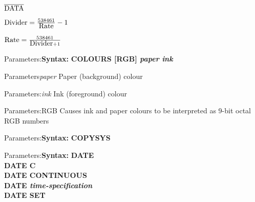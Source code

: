 \documentclass[11pt]{book}
\def\lthtmlcheckvsize{\ifdim\ht\sizebox<\vsize 
  \ifdim\wd\sizebox<\hsize\expandafter\hfill\fi \expandafter\vfill
  \else\expandafter\vss\fi}%
\begin{document}
{\newpage\clearpage
{}%
$\overline{\hbox{DATA}}$%
\lthtmlindisplaymathZ
\lthtmlcheckvsize\clearpage}

{\newpage\clearpage
{}%
$\hbox{Divider}=\frac{538461}{\hbox{Rate}}-1$%
\lthtmlindisplaymathZ
\lthtmlcheckvsize\clearpage}

{\newpage\clearpage
{}%
$\hbox{Rate}=\frac{538461}{\hbox{Divider}+1}$%
\lthtmlindisplaymathZ
\lthtmlcheckvsize\clearpage}

{\newpage\clearpage
{}%
\begin{labeledpar}{Parameters:}{\textbf{Syntax:}}
\textbf{COLOURS [RGB] \textit{paper} \textit{ink}}
\end{labeledpar}%
\lthtmlfigureZ
\lthtmlcheckvsize\clearpage}

{\newpage\clearpage
{}%
\begin{labeledpar}{Parameters}{\textit{paper}}
  Paper (background) colour
\end{labeledpar}%
\lthtmlfigureZ
\lthtmlcheckvsize\clearpage}

{\newpage\clearpage
{}%
\begin{labeledpar}{Parameters:}{\textit{ink}}
  Ink (foreground) colour
\end{labeledpar}%
\lthtmlfigureZ
\lthtmlcheckvsize\clearpage}

{\newpage\clearpage
{}%
\begin{labeledpar}{Parameters:}{RGB}
  Causes ink and paper colours to be interpreted as 9-bit octal RGB numbers
\end{labeledpar}%
\lthtmlfigureZ
\lthtmlcheckvsize\clearpage}

{\newpage\clearpage
{}%
\begin{labeledpar}{Parameters:}{\textbf{Syntax:}}
\textbf{COPYSYS}
\end{labeledpar}%
\lthtmlfigureZ
\lthtmlcheckvsize\clearpage}

{\newpage\clearpage
{}%
\begin{labeledpar}{Parameters:}{\textbf{Syntax:}}
\textbf{DATE}\\
\textbf{DATE C}\\
\textbf{DATE CONTINUOUS}\\
\textbf{DATE \textit{time-specification}}\\
\textbf{DATE SET}
\end{labeledpar}%
\lthtmlfigureZ
\lthtmlcheckvsize\clearpage}
\end{document}
